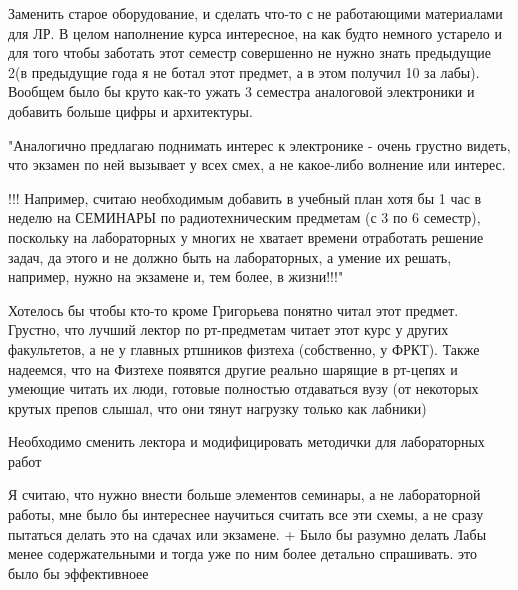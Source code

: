         
        \begin{commentbox}
            Заменить старое оборудование, и сделать что-то с не работающими материалами для ЛР. В целом наполнение курса интересное, на как будто немного устарело и для того чтобы заботать этот семестр совершенно не нужно знать предыдущие 2(в предыдущие года я не ботал этот предмет, а в этом получил 10 за лабы). Вообщем было бы круто как-то ужать 3 семестра аналоговой электроники и добавить больше цифры и архитектуры.
        \end{commentbox}

        
        \begin{commentbox}
            "Аналогично предлагаю поднимать интерес к электронике - очень грустно видеть, что экзамен по ней вызывает у всех смех, а не какое-либо волнение или интерес.

            !!! Например, считаю необходимым добавить в учебный план хотя бы 1 час в неделю на СЕМИНАРЫ по радиотехническим предметам (с 3 по 6 семестр), поскольку на лабораторных у многих не хватает времени отработать решение задач, да этого и не должно быть на лабораторных, а умение их решать, например, нужно на экзамене и, тем более, в жизни!!!"
        \end{commentbox}
        
        \begin{commentbox}
            Хотелось бы чтобы кто-то кроме Григорьева понятно читал этот предмет.  Грустно, что лучший лектор по рт-предметам читает этот курс у других факультетов, а не у главных ртшников физтеха (собственно, у ФРКТ). Также надеемся, что на Физтехе появятся другие реально шарящие в рт-цепях и умеющие читать их люди, готовые полностью отдаваться вузу (от некоторых крутых препов слышал, что они тянут нагрузку только как лабники)
        \end{commentbox}

        \begin{commentbox}
            Необходимо  сменить лектора и модифицировать методички для лабораторных работ
        \end{commentbox}

        \begin{commentbox}
			Я считаю, что нужно внести больше элементов семинары, а не лабораторной работы, мне было бы интереснее научиться считать все эти схемы, а не сразу пытаться делать это на сдачах или экзамене. + Было бы разумно делать Лабы менее содержательными и тогда уже по ним более детально спрашивать. это было бы эффективноее
		\end{commentbox}

